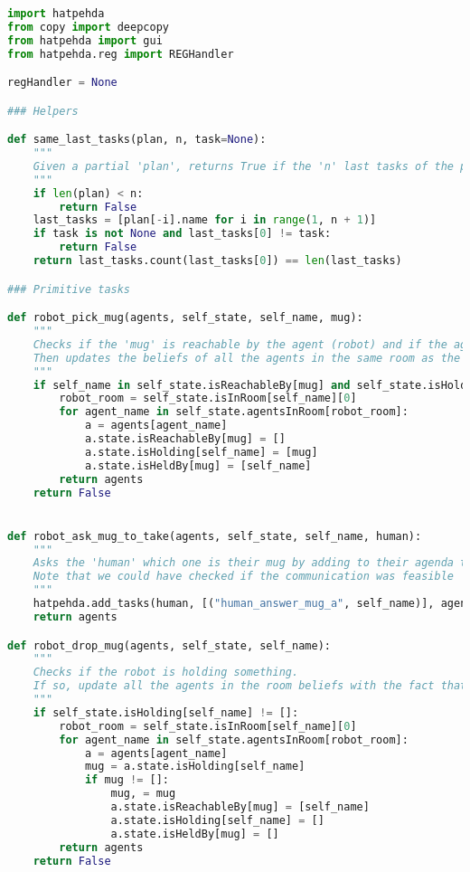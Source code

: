 \begin{lstlisting}[language=Python]
import hatpehda
from copy import deepcopy
from hatpehda import gui
from hatpehda.reg import REGHandler

regHandler = None

### Helpers

def same_last_tasks(plan, n, task=None):
    """
    Given a partial 'plan', returns True if the 'n' last tasks of the partial plan are the same (and optionally equal to 'task')
    """
    if len(plan) < n:
        return False
    last_tasks = [plan[-i].name for i in range(1, n + 1)]
    if task is not None and last_tasks[0] != task:
        return False
    return last_tasks.count(last_tasks[0]) == len(last_tasks)

### Primitive tasks

def robot_pick_mug(agents, self_state, self_name, mug):
    """
    Checks if the 'mug' is reachable by the agent (robot) and if the agent does not carry anything.
    Then updates the beliefs of all the agents in the same room as the robot as for the robot having picked the 'mug'
    """
    if self_name in self_state.isReachableBy[mug] and self_state.isHolding[self_name] == []:
        robot_room = self_state.isInRoom[self_name][0]
        for agent_name in self_state.agentsInRoom[robot_room]:
            a = agents[agent_name]
            a.state.isReachableBy[mug] = []
            a.state.isHolding[self_name] = [mug]
            a.state.isHeldBy[mug] = [self_name]
        return agents
    return False


def robot_ask_mug_to_take(agents, self_state, self_name, human):
    """
    Asks the 'human' which one is their mug by adding to their agenda that they will answer the question.
    Note that we could have checked if the communication was feasible
    """
    hatpehda.add_tasks(human, [("human_answer_mug_a", self_name)], agents)
    return agents

def robot_drop_mug(agents, self_state, self_name):
    """
    Checks if the robot is holding something.
    If so, update all the agents in the room beliefs with the fact that the robot as dropped what they thought it was holding.
    """
    if self_state.isHolding[self_name] != []:
        robot_room = self_state.isInRoom[self_name][0]
        for agent_name in self_state.agentsInRoom[robot_room]:
            a = agents[agent_name]
            mug = a.state.isHolding[self_name]
            if mug != []:
                mug, = mug
                a.state.isReachableBy[mug] = [self_name]
                a.state.isHolding[self_name] = []
                a.state.isHeldBy[mug] = []
        return agents
    return False


\end{lstlisting}
